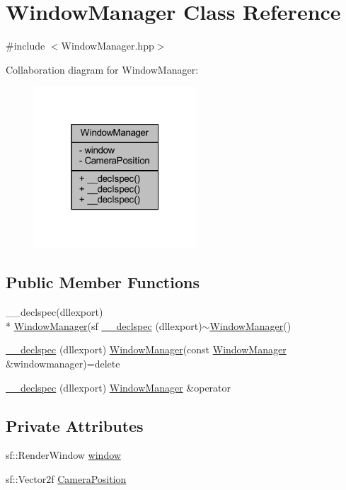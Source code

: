 \hypertarget{class_window_manager}{\section{Window\-Manager Class Reference}
\label{class_window_manager}
}


{\ttfamily \#include $<$Window\-Manager.\-hpp$>$}



Collaboration diagram for Window\-Manager\-:\nopagebreak
\begin{figure}[H]
\begin{center}
\leavevmode
\includegraphics[width=172pt]{class_window_manager__coll__graph}
\end{center}
\end{figure}
\subsection*{Public Member Functions}
\begin{DoxyCompactItemize}
\item 
\-\_\-\-\_\-declspec(dllexport) \\*
\hyperlink{class_window_manager}{Window\-Manager}(sf \hyperlink{class_window_manager_a959d7ca3b42b73b1e6c17580d9593436}{\-\_\-\-\_\-declspec} (dllexport)$\sim$\hyperlink{class_window_manager}{Window\-Manager}()
\item 
\hyperlink{class_window_manager_af0119ba52296a9c80eb41a49a49270be}{\-\_\-\-\_\-declspec} (dllexport) \hyperlink{class_window_manager}{Window\-Manager}(const \hyperlink{class_window_manager}{Window\-Manager} \&windowmanager)=delete
\item 
\hyperlink{class_window_manager_a6b83e3acf96e8c764f9900227a6c3bf8}{\-\_\-\-\_\-declspec} (dllexport) \hyperlink{class_window_manager}{Window\-Manager} \&operator
\end{DoxyCompactItemize}
\subsection*{Private Attributes}
\begin{DoxyCompactItemize}
\item 
sf\-::\-Render\-Window \hyperlink{class_window_manager_a61d47c11da0af06b979ec784a21349ea}{window}
\item 
sf\-::\-Vector2f \hyperlink{class_window_manager_a459ad4d059f5c4f286c24af4550c6101}{Camera\-Position}
\end{DoxyCompactItemize}


